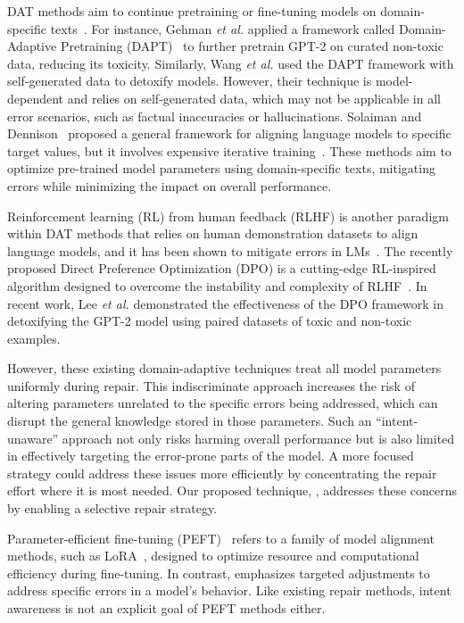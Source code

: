 DAT methods aim to continue pretraining or fine-tuning models on domain-specific texts~\cite{gehman2020realtoxicityprompts,lee2024mechanistic}. For instance, Gehman \textit{et al.} \cite{gehman2020realtoxicityprompts} applied a framework called Domain-Adaptive Pretraining (DAPT)~\cite{gururangan2020don} to further pretrain GPT-2 on curated non-toxic data, reducing its toxicity. Similarly, Wang \textit{et al.} \cite{wang2022exploring} used the DAPT framework with self-generated data to detoxify models. However, their technique is model-dependent and relies on self-generated data, which may not be applicable in all error scenarios, such as factual inaccuracies or hallucinations. Solaiman and Dennison~\cite{solaiman2021process} proposed a general framework for aligning language models to specific target values, but it involves expensive iterative training~\cite{si2022prompting}. These methods aim to optimize pre-trained model parameters using domain-specific texts, mitigating errors while minimizing the impact on overall performance.

Reinforcement learning (RL) from human feedback (RLHF) is another paradigm within DAT methods that relies on human demonstration datasets to align language models, and it has been shown to mitigate errors in LMs~\cite{ouyang2022training}. The recently proposed Direct Preference Optimization (DPO) is a cutting-edge RL-inspired algorithm designed to overcome the instability and complexity of RLHF~\cite{rafailov2024direct}. In recent work, Lee \textit{et al.} \cite{lee2024mechanistic} demonstrated the effectiveness of the DPO framework in detoxifying the GPT-2 model using paired datasets of toxic and non-toxic examples.


However, these existing domain-adaptive techniques treat all model parameters uniformly during repair. This indiscriminate approach increases the risk of altering parameters unrelated to the specific errors being addressed, which can disrupt the general knowledge stored in those parameters. Such an ``intent-unaware'' approach not only risks harming overall performance but is also limited in effectively targeting the error-prone parts of the model. A more focused strategy could address these issues more efficiently by concentrating the repair effort where it is most needed. Our proposed technique, \nick, addresses these concerns by enabling a selective repair strategy.

Parameter-efficient fine-tuning (PEFT)~\cite{ding2023parameter} refers to a family of model alignment methods, such as LoRA~\cite{hu2021lora}, designed to optimize resource and computational efficiency during fine-tuning. In contrast, \nick emphasizes targeted adjustments to address specific errors in a model’s behavior. Like existing repair methods, intent awareness is not an explicit goal of PEFT methods either.



